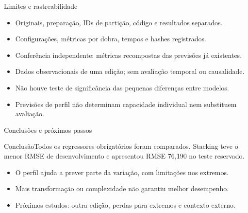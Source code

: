 \begin{frame}{Limites e rastreabilidade}
\begin{itemize}\item Originais, preparação, IDs de partição, código e resultados separados.
\item Configurações, métricas por dobra, tempos e hashes registrados.
\item Conferência independente: métricas recompostas das previsões já existentes.
\item Dados observacionais de uma edição; sem avaliação temporal ou causalidade.
\item Não houve teste de significância das pequenas diferenças entre modelos.
\item Previsões de perfil não determinam capacidade individual nem substituem avaliação.\end{itemize}
\end{frame}
\begin{frame}{Conclusões e próximos passos}
\begin{block}{Conclusão}Todos os regressores obrigatórios foram comparados. Stacking teve o menor RMSE de desenvolvimento e apresentou RMSE 76,190 no teste reservado.\end{block}
\begin{itemize}\item O perfil ajuda a prever parte da variação, com limitações nos extremos.
\item Mais transformação ou complexidade não garantiu melhor desempenho.
\item Próximos estudos: outra edição, perdas para extremos e contexto externo.
\end{itemize}
\end{frame}

